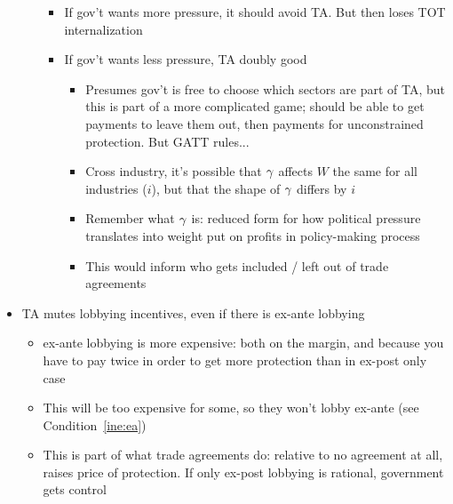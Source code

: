 \begin{itemize}
\begin{itemize}
\begin{itemize}
					\item If gov't wants more pressure, it should avoid TA. But then loses TOT internalization
					\item If gov't wants less pressure, TA doubly good
						\begin{itemize}
							\item Presumes gov't is free to choose which sectors are part of TA, but this is part of a more complicated game; should be able to get payments to leave them out, then payments for unconstrained protection. But GATT rules...
							\item Cross industry, it's possible that $\gamma$ affects $W$ the same for all industries ($i$), but that the shape of $\gamma$ differs by $i$
							\item Remember what $\gamma$ is: reduced form for how political pressure translates into weight put on profits in policy-making process
							\item This would inform who gets included / left out of trade agreements
						\end{itemize}
					\end{itemize}
		\end{itemize}
	\item TA mutes lobbying incentives, even if there is ex-ante lobbying
		\begin{itemize}
			\item ex-ante lobbying is more expensive: both on the margin, and because you have to pay twice in order to get more protection than in ex-post only case
			\item This will be too expensive for some, so they won't lobby ex-ante (see Condition~\ref{ine:ea})
			\item This is part of what trade agreements do: relative to no agreement at all, raises price of protection. If only ex-post lobbying is rational, government gets control
		\end{itemize}


\end{itemize}
